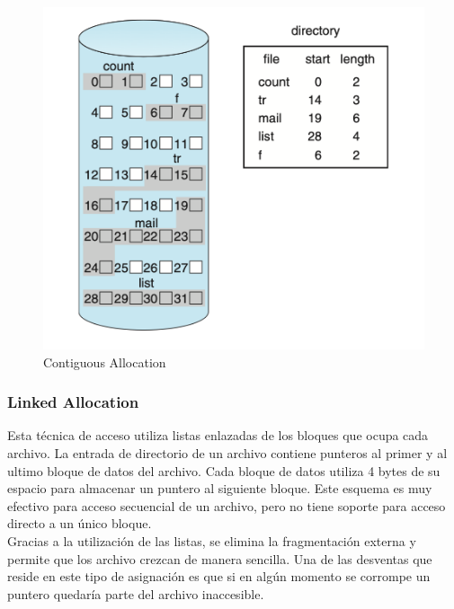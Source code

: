 \begin{figure}[H]
    \centering
    \includegraphics[scale=0.65]{doc/assets/images/Allocation Methods/continuous.png}
    \caption{Contiguous Allocation}
    \label{fig:my_label}
\end{figure}
\subsubsection{Linked Allocation}
Esta técnica de acceso utiliza listas enlazadas de los bloques que ocupa cada archivo. La entrada de directorio de un archivo contiene punteros al primer y al ultimo bloque de datos del archivo. Cada bloque de datos utiliza 4 bytes de su espacio para almacenar un puntero al siguiente bloque. Este esquema es muy efectivo para acceso secuencial de un archivo, pero no tiene soporte para acceso directo a un único bloque. \cite{silberchatz}\\

Gracias a la utilización de las listas, se elimina la fragmentación externa y permite que los archivo crezcan de manera sencilla. Una de las desventas que reside en este tipo de asignación es que si en algún momento se corrompe un puntero quedaría parte del archivo inaccesible.\cite{silberchatz}

